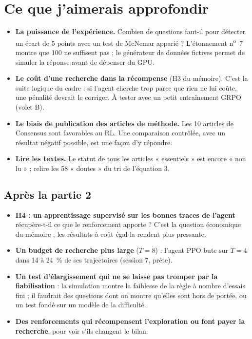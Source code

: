 \documentclass[10pt,a4paper]{article}
\begin{document}
\section{Ce que j'aimerais approfondir}

\begin{itemize}
\item \textbf{La puissance de l'expérience.} Combien de questions faut-il pour détecter un écart de 5 points avec un test de McNemar apparié ? L'étonnement n\textsuperscript{o}~7 montre que 100 ne suffisent pas ; le générateur de données fictives permet de simuler la réponse avant de dépenser du GPU.
\item \textbf{Le coût d'une recherche dans la récompense} (H3 du mémoire). C'est la suite logique du cadre : si l'agent cherche trop parce que rien ne lui coûte, une pénalité devrait le corriger. À tester avec un petit entraînement GRPO (volet B).
\item \textbf{Le biais de publication des articles de méthode.} Les 10 articles de Consensus sont favorables au RL. Une comparaison contrôlée, avec un résultat négatif possible, est une façon d'y répondre.
\item \textbf{Lire les textes.} Le statut de tous les articles « essentiels » est encore « non lu » ; relire les 58 « doutes » du tri de l'équation 3.
\end{itemize}

\subsection*{Après la partie 2}
\begin{itemize}
\item \textbf{H4 : un apprentissage supervisé sur les bonnes traces de l'agent} récupère-t-il ce que le renforcement apporte ? C'est la question économique du mémoire ; les résultats à coût égal la rendent plus pressante.
\item \textbf{Un budget de recherche plus large} ($T = 8$) : l'agent PPO bute sur $T = 4$ dans 14 à 24~\% de ses trajectoires (session 7, prête).
\item \textbf{Un test d'élargissement qui ne se laisse pas tromper par la fiabilisation} : la simulation montre la faiblesse de la règle à nombre d'essais fini ; il faudrait des questions dont on montre qu'elles sont hors de portée, ou un test fondé sur un modèle de la difficulté.
\item \textbf{Des renforcements qui récompensent l'exploration ou font payer la recherche}, pour voir s'ils changent le bilan.
\end{itemize}
\end{document}
